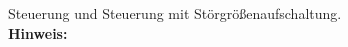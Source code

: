 \begin{question}[section=4,name={Steuerung},difficulty=,type=mdl,tags={}]
	Steuerung und Steuerung mit Störgrößenaufschaltung.
	\\ \textbf{Hinweis:}\\
	
\end{question}
\begin{solution}
	
\end{solution}